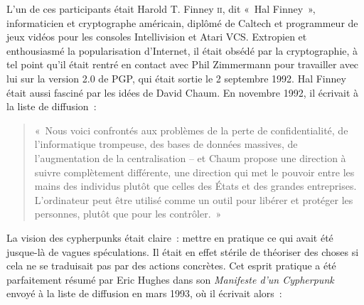 L'un de ces participants était Harold T. Finney \textsc{ii}, dit «~Hal Finney~», informaticien et cryptographe américain, diplômé de Caltech et programmeur de jeux vidéos pour les consoles Intellivision et Atari VCS. Extropien et enthousiasmé la popularisation d'Internet, il était obsédé par la cryptographie, à tel point qu'il était rentré en contact avec Phil Zimmermann pour travailler avec lui sur la version 2.0 de PGP, qui était sortie le 2 septembre 1992. Hal Finney était aussi fasciné par les idées de David Chaum. En novembre 1992, il écrivait à la liste de diffusion~:

\begin{quote}
«~Nous voici confrontés aux problèmes de la perte de confidentialité, de l'informatique trompeuse, des bases de données massives, de l'augmentation de la centralisation -- et Chaum propose une direction à suivre complètement différente, une direction qui met le pouvoir entre les mains des individus plutôt que celles des États et des grandes entreprises. L'ordinateur peut être utilisé comme un outil pour libérer et protéger les personnes, plutôt que pour les contrôler.~»
\end{quote}

La vision des cypherpunks était claire~: mettre en pratique ce qui avait été jusque-là de vagues spéculations. Il était en effet stérile de théoriser des choses si cela ne se traduisait pas par des actions concrètes. Cet esprit pratique a été parfaitement résumé par Eric Hughes dans son \emph{Manifeste d'un Cypherpunk} envoyé à la liste de diffusion en mars 1993, où il écrivait alors~:

